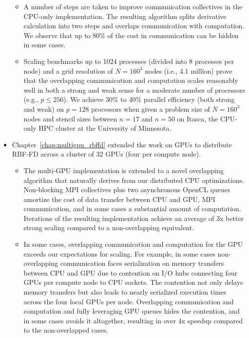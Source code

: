 \begin{itemize}
\begin{itemize}
\item A number of steps are taken to improve communication collectives in the CPU-only implementation. The resulting algorithm splits derivative calculation into two steps and overlaps communication with computation. We observe that up to 80\% of the cost in communication can be hidden in some cases. 

\item Scaling benchmarks up to 1024 processes (divided into 8 processes per node) and a grid resolution of $N=160^3$ nodes (i.e., 4.1 million) prove that the overlapping communication and computation scales reasonably well in both a strong and weak sense for a moderate number of processors (e.g., $p \leq 256$). We achieve 30\% to 40\% parallel efficiency (both strong and weak) on $p=128$ processors when given a problem size of $N=160^3$ nodes and stencil sizes between $n=17$ and $n=50$ on Itasca, the CPU-only HPC cluster at the University of Minnesota. %

\end{itemize} 

\item Chapter~\ref{chap:multigpu_rbffd} extended the work on GPUs to distribute RBF-FD across a cluster of 32 GPUs (four per compute node). %
\begin{itemize} 
\item The multi-GPU implementation is extended to a novel overlapping algorithm that naturally derives from our distributed CPU optimizations. Non-blocking MPI collectives plus two asynchronous OpenCL queues amortize the cost of data transfer between CPU and GPU, MPI communication, and in some cases a substantial amount of computation. Iterations of the resulting implementation achieve an average of 3x better strong scaling compared to a non-overlapping equivalent. 
\item In some cases, overlapping communication and computation for the GPU exceeds our expectations for scaling. For example, in some cases non-overlapping communication faces serialization on memory transfers between CPU and GPU due to contention on I/O hubs connecting four GPUs per compute node to CPU sockets. The contention not only delays memory transfers but also leads to nearly serialized execution times across the four local GPUs per node. Overlapping communication and computation and fully leveraging GPU queues hides the contention, and in some cases avoids it altogether, resulting in over 4x speedup compared to the non-overlapped cases. 
\end{itemize} 


\end{itemize}
